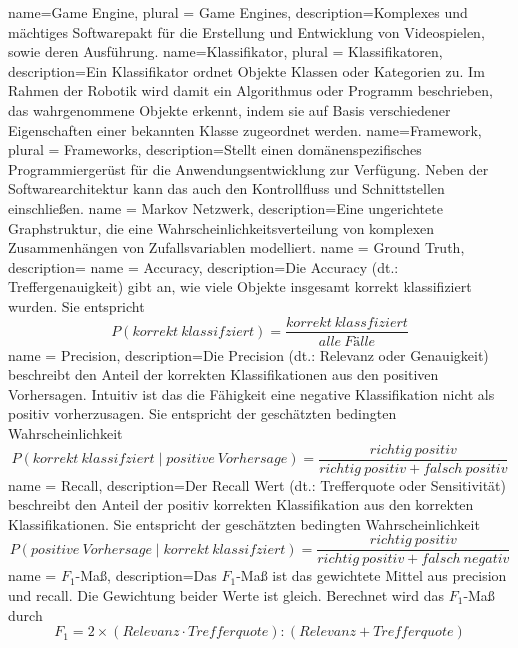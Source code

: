 {
  name=Game Engine,
  plural = {Game Engines},
  description={Komplexes und mächtiges Softwarepakt für die Erstellung und Entwicklung von Videospielen, sowie deren Ausführung.}
}
{
  name=Klassifikator,
  plural = {Klassifikatoren},
  description={Ein Klassifikator ordnet Objekte Klassen oder Kategorien zu. Im Rahmen der Robotik wird damit ein Algorithmus oder Programm beschrieben, das wahrgenommene Objekte erkennt, indem sie auf Basis verschiedener Eigenschaften einer bekannten Klasse zugeordnet werden.}
}
{
  name=Framework,
  plural = {Frameworks},
  description={Stellt einen domänenspezifisches Programmiergerüst für die Anwendungsentwicklung zur Verfügung. Neben der Softwarearchitektur kann das auch den Kontrollfluss und Schnittstellen einschließen.}
}
{
  name = {Markov Netzwerk},
  description={Eine ungerichtete Graphstruktur, die eine Wahrscheinlichkeitsverteilung von komplexen Zusammenhängen von Zufallsvariablen modelliert.}
}
{
  name = {Ground Truth},
  description={\todo{}}
}
{
  name = {Accuracy},
  description={Die Accuracy (dt.: Treffergenauigkeit) gibt an, wie viele Objekte insgesamt korrekt klassifiziert wurden. Sie entspricht \begin{displaymath}
P(korrekt\ klassifziert) = \frac{korrekt\ klassfiziert}{alle\ Fälle} 
\end{displaymath}}
}
{
  name = {Precision},
  description={Die Precision (dt.: Relevanz oder Genauigkeit) beschreibt den Anteil der korrekten Klassifikationen aus den positiven Vorhersagen. Intuitiv ist das die Fähigkeit eine negative Klassifikation nicht als positiv vorherzusagen. Sie entspricht der geschätzten bedingten Wahrscheinlichkeit \begin{displaymath}
P(korrekt\ klassifziert \mid positive\ Vorhersage) = \frac{richtig\ positiv}{richtig\ positiv + falsch\ positiv}
\end{displaymath}}
}
{
  name = {Recall},
  description={Der Recall Wert (dt.: Trefferquote oder Sensitivität) beschreibt den Anteil der positiv korrekten Klassifikation aus den korrekten Klassifikationen. Sie entspricht der geschätzten bedingten Wahrscheinlichkeit \begin{displaymath}
P(positive\ Vorhersage \mid korrekt\ klassifziert) = \frac{richtig\ positiv}{richtig\ positiv + falsch\ negativ}
\end{displaymath}}
}
{
  name = {$F_1$-Maß},
  description={Das $F_1$-Maß ist das gewichtete Mittel aus \gls{precision} und \gls{recall}. Die Gewichtung beider Werte ist gleich. Berechnet wird das $F_1$-Maß durch
\begin{displaymath}
F_1 = 2 \times (Relevanz \cdot Trefferquote) : (Relevanz + Trefferquote)
\end{displaymath}}
}

